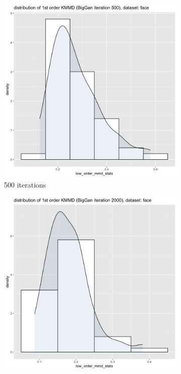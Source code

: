 \documentclass{article}
\begin{document}
\begin{figure}[h!]
    \caption{Dataset Face}
     \centering
     \begin{subfigure}[b]{0.3\textwidth}
         \centering
         \includegraphics[width=\textwidth]{kmmd_figures/biggan_face_lowdist_500.png}
         \caption{500 iterations}
     \end{subfigure}
     \hfill
     \begin{subfigure}[b]{0.3\textwidth}
         \centering
         \includegraphics[width=\textwidth]{kmmd_figures/biggan_face_lowdist_2000.png}

\end{subfigure}
\end{figure}
\end{document}
